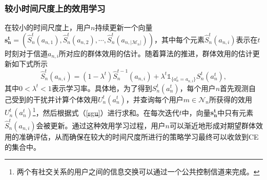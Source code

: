 \subsubsection{较小时间尺度上的效用学习}
在较小的时间尺度上，用户$n$持续更新一个向量$\mathbf{s^t_n}=\left(\hat{S}^t_n(a_{n,1}),\hat{S}^t_n(a_{n,2}),\cdots,\hat{S}^t_n(a_{n,|\mathcal{M}_n|})\right)$，其中每个元素$\hat{S}^t_n(a_{n,i})$表示在$t$时刻对于信道$a_{n,i}$所对应的群体效用的估计。随着算法的推进，群体效用的估计更新如下式所示
\begin{equation}\label{estimation}
\hat{S}^t_n(a_{n,i})=(1-\lambda^t)\hat{S}^{t-1}_n(a_{n,i})+\lambda^t\mathds{1}_{\{a^t_n=a_{n,i}\}}S^t_n(a_n^t),
\end{equation}
其中$0<\lambda^t<1$表示学习率。具体地，为了得到$S^t_n(a^t_n)$，每个用户$n$首先观测自己受到的干扰并计算个体效用$U^t_n(a^t_n)$，并查询每个用户$m\in\mathcal{N}_n$所获得的效用$U^t_n(a^t_n)$\footnote{两个有社交关系的用户之间的信息交换可以通过一个公共控制信道来完成。}，然后根据式（\ref{sgu}）进行求和。在每次迭代$t$中，向量$\mathbf{s^t_n}$中只有元素$\hat{S}^t_n(a_{n,i})$会被更新。通过这种效用学习过程，用户$n$可以渐近地形成对期望群体效用的准确评估，从而确保在较大的时间尺度所进行的策略学习最终可以收敛到CE的集合中。
